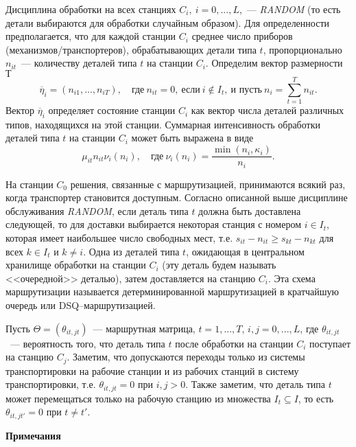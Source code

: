 Дисциплина обработки на всех станциях $C_i,~i=0,...,L$,~--- \textit{RANDOM} (то есть детали выбираются для обработки случайным образом). Для определенности предполагается, что для каждой станции $C_i$ среднее число приборов (механизмов/транспортеров), обрабатывающих детали типа $t$, пропорционально $n_{it}$~--- количеству деталей типа $t$ на станции $C_i$. Определим вектор размерности $Т$
\begin{equation*}
 \overline{\eta}_i = (n_{i1},...,n_{iT}), \quad \text{где}~ n_{it}=0, ~\text{если}~ i \notin I_t, ~\text{и пусть}~ n_i = \sum_{t=1}^{T} n_{it}.
\end{equation*}
Вектор $\overline{\eta}_i$ определяет состояние станции $C_i$ как вектор числа деталей различных типов, находящихся на этой станции.
Суммарная интенсивность обработки деталей типа $t$ на станции $C_i$ может быть выражена в виде
\begin{equation*}
 \mu_{it} n_{it} \nu_{i}(n_i), \quad \text{где} ~\nu_i(n_i) = \frac{\min(n_i, \kappa_i)}{n_i}.
\end{equation*}

На станции $C_0$ решения, связанные с маршрутизацией, принимаются всякий раз, когда транспортер становится доступным. Согласно описанной выше дисциплине обслуживания \textit{RANDOM}, если деталь типа $t$ должна быть доставлена следующей, то для доставки выбирается некоторая станция с номером $i \in I_t$, которая имеет наибольшее число свободных мест, т.е. $s_{it} - n_{it} \geqslant s_{kt} - n_{kt}$ для всех $k \in I_t$ и $k \neq i$. Одна из деталей типа $t$, ожидающая в центральном хранилище обработки на станции $C_i$ (эту деталь будем называть <<очередной>> деталью), затем доставляется на станцию $C_i$. Эта схема маршрутизации называется детерминированной маршрутизацией в кратчайшую очередь или DSQ--маршрутизацией.

Пусть $\Theta = (\theta_{it,jt})$~--- маршрутная матрица, $t=1,...,T$, $i,j=0,...,L$, где $\theta_{it,jt}$~--- вероятность того, что деталь типа $t$ после обработки на станции $C_i$ поступает на станцию $C_j$. Заметим, что допускаются переходы только из системы транспортировки на рабочие станции и из рабочих станций в систему транспортировки, т.е. $\theta_{it,jt}=0$ при $i,j>0$. Также заметим, что деталь типа $t$ может перемещаться только на рабочую станцию из множества $I_t \subseteq I$, то есть $\theta_{it,jt'}=0$ при $t \neq t'$.

\textbf{Примечания}

